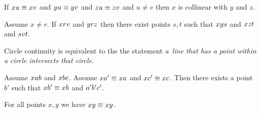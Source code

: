 \documentclass[10pt,a4paper,parskip=half,numbers=endperiod,parskip]{scrartcl}
\begin{document}
  \begin{forthel}
    \begin{axiom} %
      If $x u \equiv x v$ and $y u \equiv y v$
      and $z u \equiv z v$ and $u \neq v$
      then $x$ is collinear with $y$ and $z$.
    \end{axiom}
  \end{forthel}


  \begin{forthel}
    \begin{axiom}[Euclid]
      Assume $x \neq r$.
      If $x r v$ and $y r z$
      then there exist points $s,t$ such that
      $x y s$ and $x z t$ and $s v t$.
    \end{axiom}
  \end{forthel}



  Circle continuity is equivalent to the the statement
  \textit{a~line that has a point within a circle intersects that circle}.


  \begin{forthel}
    \begin{axiom}
      Assume $x a b$ and $x b c$.
      Assume
        $x a' \equiv x a$ and
        $x c' \equiv x c$.
      Then there exists a point $b'$ such that $x b' \equiv x b$ and $a' b' c'$.
    \end{axiom}
  \end{forthel}






  \begin{forthel}
    \begin{lemma} %
      For all points $x, y$ we have $x y \equiv x y$.
    \end{lemma}
  \end{forthel}
\end{document}

